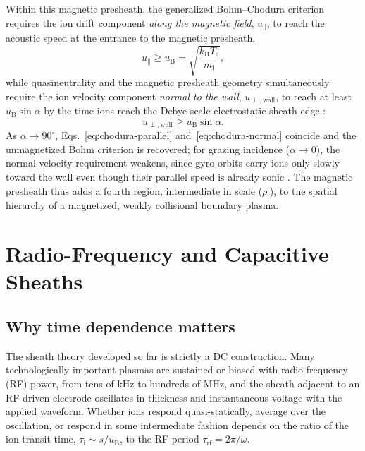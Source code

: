 Within this magnetic presheath, the generalized Bohm--Chodura criterion requires the ion drift component \emph{along the magnetic field}, $u_{\parallel}$, to reach the acoustic speed at the entrance to the magnetic presheath,
\begin{equation}
u_{\parallel} \ge u_{\mathrm{B}} = \sqrt{\frac{k_{\mathrm{B}} T_{\mathrm{e}}}{m_{\mathrm{i}}}},
\label{eq:chodura-parallel}
\end{equation}
while quasineutrality and the magnetic presheath geometry simultaneously require the ion velocity component \emph{normal to the wall}, $u_{\perp,\mathrm{wall}}$, to reach at least $u_{\mathrm{B}} \sin\alpha$ by the time ions reach the Debye-scale electrostatic sheath edge \cite{ref0017,ref0018}:
\begin{equation}
u_{\perp,\mathrm{wall}} \ge u_{\mathrm{B}} \sin\alpha.
\label{eq:chodura-normal}
\end{equation}
As $\alpha \to 90^{\circ}$, Eqs.~\eqref{eq:chodura-parallel} and~\eqref{eq:chodura-normal} coincide and the unmagnetized Bohm criterion is recovered; for grazing incidence ($\alpha \to 0$), the normal-velocity requirement weakens, since gyro-orbits carry ions only slowly toward the wall even though their parallel speed is already sonic \cite{ref0017,ref0018}. The magnetic presheath thus adds a fourth region, intermediate in scale ($\rho_{\mathrm{i}}$), to the spatial hierarchy of a magnetized, weakly collisional boundary plasma.

\section{Radio-Frequency and Capacitive Sheaths}

\subsection{Why time dependence matters}

The sheath theory developed so far is strictly a DC construction. Many technologically important plasmas are sustained or biased with radio-frequency (RF) power, from tens of kHz to hundreds of MHz, and the sheath adjacent to an RF-driven electrode oscillates in thickness and instantaneous voltage with the applied waveform. Whether ions respond quasi-statically, average over the oscillation, or respond in some intermediate fashion depends on the ratio of the ion transit time, $\tau_{\mathrm{i}} \sim s/u_{\mathrm{B}}$, to the RF period $\tau_{\mathrm{rf}} = 2\pi/\omega$.

